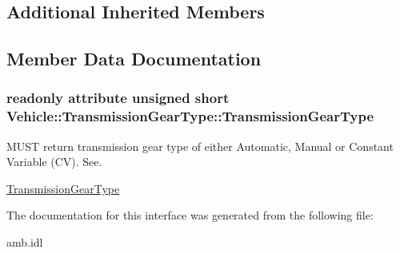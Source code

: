 \subsection*{Additional Inherited Members}


\subsection{Member Data Documentation}
\hypertarget{interfaceVehicle_1_1TransmissionGearType_a75dbfdfc51357d3c59256cb8dd43d7fd}{
\subsubsection[{Transmission\-Gear\-Type}]{\setlength{\rightskip}{0pt plus 5cm}readonly attribute unsigned short Vehicle\-::\-Transmission\-Gear\-Type\-::\-Transmission\-Gear\-Type}}\label{interfaceVehicle_1_1TransmissionGearType_a75dbfdfc51357d3c59256cb8dd43d7fd}


M\-U\-S\-T return transmission gear type of either Automatic, Manual or Constant Variable (C\-V). See. 

\hyperlink{interfaceVehicle_1_1TransmissionGearType}{Transmission\-Gear\-Type} 

The documentation for this interface was generated from the following file\-:\begin{DoxyCompactItemize}
\item 
amb.\-idl\end{DoxyCompactItemize}
